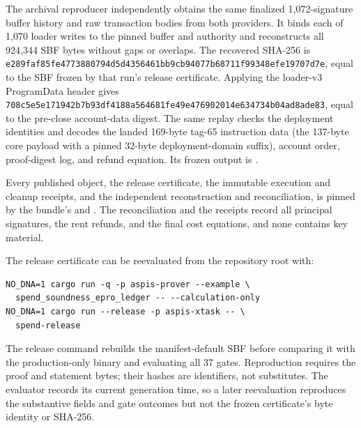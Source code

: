 The archival reproducer
 independently obtains the
same finalized 1,072-signature buffer history and raw transaction bodies from
both providers.  It binds each of 1,070 loader writes to the pinned buffer and
authority and reconstructs all 924,344 SBF bytes without gaps or overlaps.
The recovered SHA-256 is
\nolinkurl{e289faf85fe4773880794d5d4356461bb9cb94077b68711f99348efe19707d7e},
equal to the SBF frozen by that run's release certificate.  Applying the loader-v3 ProgramData header gives
\nolinkurl{708c5e5e171942b7b93df4188a564681fe49e476902014e634734b04ad8ade83},
equal to the pre-close account-data digest.  The same replay checks the
deployment identities and decodes the landed 169-byte tag-65 instruction data
(the 137-byte core payload with a pinned 32-byte deployment-domain suffix),
account order, proof-digest log, and refund equation.  Its frozen output is
.

Every published object, the release certificate, the immutable execution and
cleanup receipts, and the independent reconstruction and reconciliation, is
pinned by the bundle's  and .  The
reconciliation and the receipts record all principal signatures, the rent
refunds, and the final cost equations, and none contains key material.

The release certificate can be reevaluated from the repository root with:
\begin{verbatim}
NO_DNA=1 cargo run -q -p aspis-prover --example \
  spend_soundness_epro_ledger -- --calculation-only
NO_DNA=1 cargo run --release -p aspis-xtask -- \
  spend-release
\end{verbatim}
The release command rebuilds the manifest-default SBF before comparing it
with the production-only binary and evaluating all 37 gates.  Reproduction
requires the proof and statement bytes; their hashes are identifiers, not
substitutes.  The evaluator records its current generation time, so a later
reevaluation reproduces the substantive fields and gate outcomes but not the
frozen certificate's byte identity or SHA-256.
